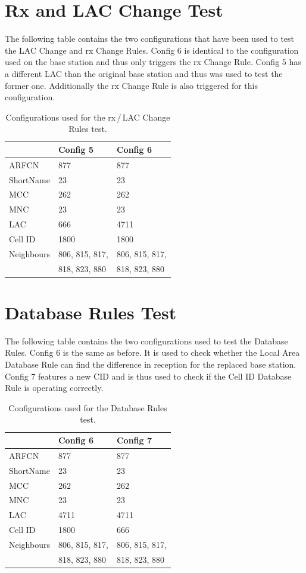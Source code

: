 \section{Rx and LAC Change Test}
\label{sec:lac_change_test}
The following table contains the two configurations that have been used to test the LAC Change and rx Change Rules.
Config 6 is identical to the configuration used on the base station and thus only triggers the rx Change Rule.
Config 5 has a different LAC than the original base station and thus was used to test the former one.
Additionally the rx Change Rule is also triggered for this configuration.
\begin{table}[h!]
\centering
\begin{tabular}{lll}
\toprule
			&Config 5		&Config 6\\
\midrule
ARFCN		&877			&877\\
ShortName	&23				&23\\
MCC			&262			&262\\
MNC			&23				&23\\
LAC			&666			&4711\\
Cell ID		&1800			&1800\\
Neighbours	&806, 815, 817,	&806, 815, 817, \\
			& 818, 823, 880	&818, 823, 880		\\
\bottomrule
\end{tabular}
\caption{Configurations used for the rx\,/\,LAC Change Rules test.}
\end{table}

\section{Database Rules Test}
\label{sec:long_term_test}
The following table contains the two configurations used to test the Database Rules.
Config 6 is the same as before.
It is used to check whether the Local Area Database Rule can find the difference in reception for the replaced base station.
Config 7 features a new CID and is thus used to check if the Cell ID Database Rule is operating correctly.
\begin{table}[h!]
\centering
\begin{tabular}{lll}
\toprule
			&Config 6		&Config 7\\
\midrule
ARFCN		&877			&877\\
ShortName	&23				&23\\
MCC			&262			&262\\
MNC			&23				&23\\
LAC			&4711			&4711\\
Cell ID		&1800			&666\\
Neighbours	&806, 815, 817,	&806, 815, 817, \\
			& 818, 823, 880	&818, 823, 880		\\
\bottomrule
\end{tabular}
\caption{Configurations used for the Database Rules test.}
\end{table}